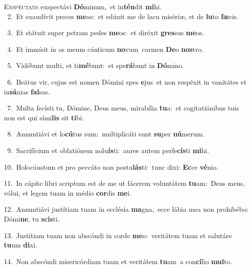 \lettrine{\initial\textcolor{\initialcolor}{E}}{xspéctans} exspectávi \textbf{Dó}\-minum,~\star et in\-\textbf{tén}\-dit \textbf{mi}\-hi.\\
{\numbfont\textcolor{\numbcolor}{~2.}}~Et exaudívit preces \textbf{me}\-as:~\star et edúxit me de lacu misériæ, et de \textbf{lu}\-to \textbf{fæ}\-cis.\par
{\numbfont\textcolor{\numbcolor}{~3.}}~Et státuit super petram pedes \textbf{me}\-os:~\star et diréxit \textbf{gres}\-sus \textbf{me}\-os.\par
{\numbfont\textcolor{\numbcolor}{~4.}}~Et immísit in os meum cánticum \textbf{no}\-vum~\star carmen \textbf{De}\-o \textbf{nos}\-tro.\par
{\numbfont\textcolor{\numbcolor}{~5.}}~Vidébunt multi, et ti\-\textbf{mé}\-bunt:~\star et spe\-\textbf{rá}\-bunt in \textbf{Dó}\-mino.\par
{\numbfont\textcolor{\numbcolor}{~6.}}~Beátus vir, cujus est nomen Dómini spes \textbf{e}\-jus~\star et non respéxit in vanitátes et in\-\textbf{sá}\-nias \textbf{fal}\-sas.\par
{\numbfont\textcolor{\numbcolor}{~7.}}~Multa fecísti tu, Dómine, Deus meus, mirabília \textbf{tu}\-a:~\star et cogitatiónibus tuis non est qui sími\textbf{lis} sit \textbf{ti}\-bi.\par
{\numbfont\textcolor{\numbcolor}{~8.}}~Annuntiávi et lo\-\textbf{cú}\-tus sum:~\star multiplicáti sunt \textbf{su}\-per \textbf{nú}\-merum.\par
{\numbfont\textcolor{\numbcolor}{~9.}}~Sacrifícium et oblatiónem nolu\-\textbf{ís}\-ti:~\star aures autem perfe\-\textbf{cís}\-ti \textbf{mi}\-hi.\par
{\numbfont\textcolor{\numbcolor}{10.}}~Holocáustum et pro peccáto non postu\-\textbf{lás}\-ti:~\star tunc dixi: \textbf{Ec}\-ce \textbf{vé}\-nio.\par
{\numbfont\textcolor{\numbcolor}{11.}}~In cápite libri scriptum est de me ut fácerem voluntátem \textbf{tu}\-am:~\star Deus meus, vólui, et legem tuam in médio \textbf{cor}\-dis \textbf{me}\-i.\par
{\numbfont\textcolor{\numbcolor}{12.}}~Annuntiávi justítiam tuam in ecclésia \textbf{ma}\-gna,~\star ecce lábia mea non prohibébo: Dómi\-\textbf{ne}\-, tu \textbf{scis}\-ti.\par
{\numbfont\textcolor{\numbcolor}{13.}}~Justítiam tuam non abscóndi in corde \textbf{me}\-o:~\star veritátem tuam et salutáre \textbf{tu}\-um \textbf{di}\-xi.\par
{\numbfont\textcolor{\numbcolor}{14.}}~Non abscóndi misericórdiam tuam et veritátem \textbf{tu}\-am~\star a con\-\textbf{cí}\-lio \textbf{mul}\-to.\par

